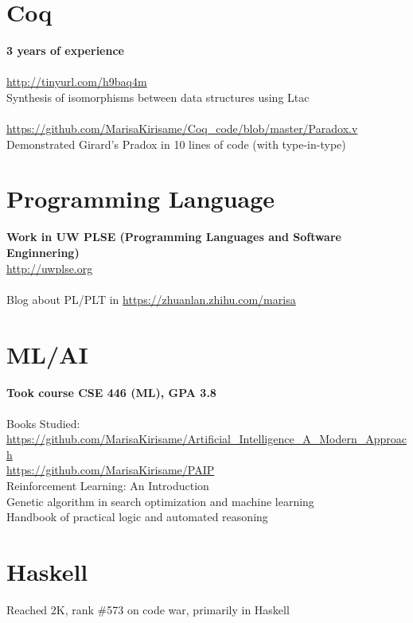 \documentclass[margin,line]{res}
\begin{document}
\begin{resume}
\section{\sc Coq} 
\textbf{3 years of experience} \\
\\
\url{http://tinyurl.com/h9baq4m} \\
Synthesis of isomorphisms between data structures using Ltac \\
\\
\url{https://github.com/MarisaKirisame/Coq_code/blob/master/Paradox.v} \\
Demonstrated Girard's Pradox in 10 lines of code (with type-in-type)

\section{\sc Programming Language}
\textbf{Work in UW PLSE (Programming Languages and Software Enginnering)} \\
\url{http://uwplse.org}
\\
\\
Blog about PL/PLT in \url{https://zhuanlan.zhihu.com/marisa}

\section{ML/AI}
\textbf{Took course CSE 446 (ML), GPA 3.8} \\
\\
Books Studied: \\
\url{https://github.com/MarisaKirisame/Artificial_Intelligence_A_Modern_Approach} \\
\url{https://github.com/MarisaKirisame/PAIP} \\
Reinforcement Learning: An Introduction \\
Genetic algorithm in search optimization and machine learning \\
Handbook of practical logic and automated reasoning

\section{\sc Haskell} Reached 2K, rank \#573 on code war, primarily in Haskell

\vspace*{-.2in}

\end{resume}
\end{document}
